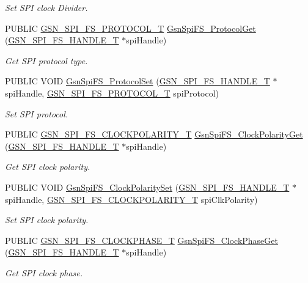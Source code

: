 \begin{DoxyCompactItemize}
\begin{DoxyCompactList}\small\item\em Set SPI clock Divider. \end{DoxyCompactList}\item 
PUBLIC \hyperlink{a00655_gaa9b496d91ebb6c1e80cbd1b076c55f40}{GSN\_\-SPI\_\-FS\_\-PROTOCOL\_\-T} \hyperlink{a00655_ga8abe5bf5b320cfe2a1ba59d7db38219d}{GsnSpiFS\_\-ProtocolGet} (\hyperlink{a00234}{GSN\_\-SPI\_\-FS\_\-HANDLE\_\-T} $\ast$spiHandle)
\begin{DoxyCompactList}\small\item\em Get SPI protocol type. \end{DoxyCompactList}\item 
PUBLIC VOID \hyperlink{a00655_ga574267f38c56283722d26a2d9e6f2685}{GsnSpiFS\_\-ProtocolSet} (\hyperlink{a00234}{GSN\_\-SPI\_\-FS\_\-HANDLE\_\-T} $\ast$spiHandle, \hyperlink{a00655_gaa9b496d91ebb6c1e80cbd1b076c55f40}{GSN\_\-SPI\_\-FS\_\-PROTOCOL\_\-T} spiProtocol)
\begin{DoxyCompactList}\small\item\em Set SPI protocol. \end{DoxyCompactList}\item 
PUBLIC \hyperlink{a00655_ga68952a1f7c2baa0ffb682a9689229eaf}{GSN\_\-SPI\_\-FS\_\-CLOCKPOLARITY\_\-T} \hyperlink{a00655_gab631429f4a7a2ddbc8d5c37a85ea7196}{GsnSpiFS\_\-ClockPolarityGet} (\hyperlink{a00234}{GSN\_\-SPI\_\-FS\_\-HANDLE\_\-T} $\ast$spiHandle)
\begin{DoxyCompactList}\small\item\em Get SPI clock polarity. \end{DoxyCompactList}\item 
PUBLIC VOID \hyperlink{a00655_ga5b885df59ba03c81bc39d64293661427}{GsnSpiFS\_\-ClockPolaritySet} (\hyperlink{a00234}{GSN\_\-SPI\_\-FS\_\-HANDLE\_\-T} $\ast$spiHandle, \hyperlink{a00655_ga68952a1f7c2baa0ffb682a9689229eaf}{GSN\_\-SPI\_\-FS\_\-CLOCKPOLARITY\_\-T} spiClkPolarity)
\begin{DoxyCompactList}\small\item\em Set SPI clock polarity. \end{DoxyCompactList}\item 
PUBLIC \hyperlink{a00655_gaf3bb2adb7491e3d235c486d48f1b506d}{GSN\_\-SPI\_\-FS\_\-CLOCKPHASE\_\-T} \hyperlink{a00655_gadeb4e9dbec6a7632d99cb70571e3aa79}{GsnSpiFS\_\-ClockPhaseGet} (\hyperlink{a00234}{GSN\_\-SPI\_\-FS\_\-HANDLE\_\-T} $\ast$spiHandle)
\begin{DoxyCompactList}\small\item\em Get SPI clock phase. \end{DoxyCompactList}\item 

\end{DoxyCompactItemize}
